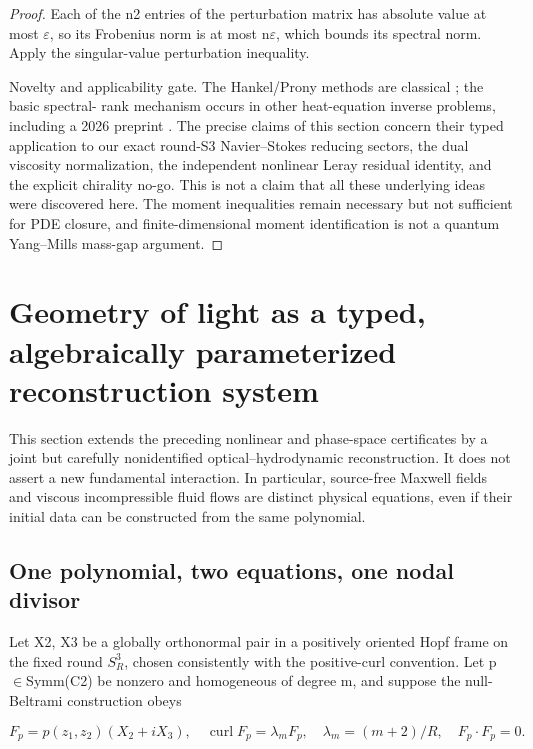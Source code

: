 \documentclass[10pt,letterpaper]{article}
\theoremstyle{remark}
\begin{document}
\begin{proof}
Each of the n2 entries of the perturbation matrix has absolute value at most \(\varepsilon \), so its Frobenius norm is at most n\(\varepsilon \), which bounds its spectral norm. Apply the singular-value perturbation inequality.

Novelty and applicability gate. The Hankel/Prony methods are classical \cite{ref1,ref2}; the basic spectral- rank mechanism occurs in other heat-equation inverse problems, including a 2026 preprint \cite{ref3}. The precise claims of this section concern their typed application to our exact round-S3 Navier–Stokes reducing sectors, the dual viscosity normalization, the independent nonlinear Leray residual identity, and the explicit chirality no-go. This is not a claim that all these underlying ideas were discovered here. The moment inequalities remain necessary but not sufficient for PDE closure, and finite-dimensional moment identification is not a quantum Yang–Mills mass-gap argument.


\end{proof}

\section{Geometry of light as a typed, algebraically parameterized reconstruction system}


This section extends the preceding nonlinear and phase-space certificates by a joint but carefully nonidentified optical–hydrodynamic reconstruction. It does not assert a new fundamental interaction. In particular, source-free Maxwell fields and viscous incompressible fluid flows are distinct physical equations, even if their initial data can be constructed from the same polynomial.


\subsection{One polynomial, two equations, one nodal divisor}

Let X2, X3 be a globally orthonormal pair in a positively oriented Hopf frame on the fixed round \(S_R^3\), chosen consistently with the positive-curl convention. Let p \(\in \)Symm(C2) be nonzero and homogeneous of degree m, and suppose the null-Beltrami construction obeys



\begin{equation}
\tag{100}\label{eq:100}
F_p=p(z_1,z_2)(X_2+iX_3),\quad\operatorname{curl}F_p=\lambda_mF_p,\quad\lambda_m=(m+2)/R,\quad F_p\cdot F_p=0.
\end{equation}
\end{document}
